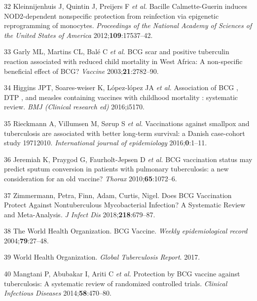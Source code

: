 \documentclass[11pt,twoside]{bristolthesis}
\begin{document}
  \leavevmode\hypertarget{ref-Kleinnijenhuis2012}{}%
  32 Kleinnijenhuis J, Quintin J, Preijers F \emph{et al.} Bacille Calmette-Guerin induces NOD2-dependent nonspecific protection from reinfection via epigenetic reprogramming of monocytes. \emph{Proceedings of the National Academy of Sciences of the United States of America} 2012;\textbf{109}:17537--42.
  
  \leavevmode\hypertarget{ref-Garly2003}{}%
  33 Garly ML, Martins CL, Balé C \emph{et al.} BCG scar and positive tuberculin reaction associated with reduced child mortality in West Africa: A non-specific beneficial effect of BCG? \emph{Vaccine} 2003;\textbf{21}:2782--90.
  
  \leavevmode\hypertarget{ref-Higgins}{}%
  34 Higgins JPT, Soares-weiser K, López-lópez JA \emph{et al.} Association of BCG , DTP , and measles containing vaccines with childhood mortality : systematic review. \emph{BMJ (Clinical research ed)} 2016;i5170.
  
  \leavevmode\hypertarget{ref-Rieckmann2016}{}%
  35 Rieckmann A, Villumsen M, Sørup S \emph{et al.} Vaccinations against smallpox and tuberculosis are associated with better long-term survival: a Danish case-cohort study 19712010. \emph{International journal of epidemiology} 2016;\textbf{0}:1--11.
  
  \leavevmode\hypertarget{ref-Jeremiah2010}{}%
  36 Jeremiah K, Praygod G, Faurholt-Jepsen D \emph{et al.} BCG vaccination status may predict sputum conversion in patients with pulmonary tuberculosis: a new consideration for an old vaccine? \emph{Thorax} 2010;\textbf{65}:1072--6.
  
  \leavevmode\hypertarget{ref-Zimmermann:2018io}{}%
  37 Zimmermann, Petra, Finn, Adam, Curtis, Nigel. Does BCG Vaccination Protect Against Nontuberculous Mycobacterial Infection? A Systematic Review and Meta-Analysis. \emph{J Infect Dis} 2018;\textbf{218}:679--87.
  
  \leavevmode\hypertarget{ref-The2004}{}%
  38 The World Health Organization. BCG Vaccine. \emph{Weekly epidemiological record} 2004;\textbf{79}:27--48.
  
  \leavevmode\hypertarget{ref-WHO2017}{}%
  39 World Health Organization. \emph{Global Tuberculosis Report}. 2017.
  
  \leavevmode\hypertarget{ref-Mangtani2014}{}%
  40 Mangtani P, Abubakar I, Ariti C \emph{et al.} Protection by BCG vaccine against tuberculosis: A systematic review of randomized controlled trials. \emph{Clinical Infectious Diseases} 2014;\textbf{58}:470--80.
  
\end{document}
